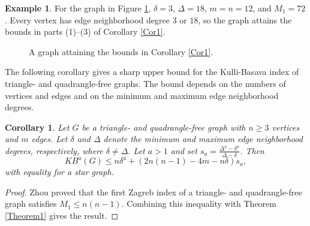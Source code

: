 \documentclass[11pt, oneside]{amsart}   	%
\newtheorem{cor}[theorem]{Corollary}
\theoremstyle{definition}
\newtheorem{example}[theorem]{Example}
\theoremstyle{remark}
\numberwithin{equation}{section}
\begin{document}
\begin{example}
For the graph in Figure \ref{fig:1}, $\delta=3$, $\Delta=18$, $m=n=12$, and $M_1=72$. Every vertex has edge neighborhood degree $3$ or $18$, so the graph attains the bounds in parts (1)--(3) of Corollary \ref{Cor1}.
\begin{figure}[h]
\centering
\begin{minipage}{.4\textwidth}
  \centering
\caption{A graph attaining the bounds in Corollary \ref{Cor1}.}
  \label{fig:1}
\end{minipage}%

\end{figure}
\end{example}

The following corollary gives a sharp upper bound for the Kulli-Basava index of triangle- and quadrangle-free graphs. The bound depends on the numbers of vertices and edges and on the minimum and maximum edge neighborhood degrees.

\begin{cor}
Let $G$ be a triangle- and quadrangle-free graph with $n\geq 3$ vertices and $m$ edges. Let $\delta$ and $\Delta$ denote the minimum and maximum edge neighborhood degrees, respectively, where $\delta\neq\Delta$. Let $a>1$ and set $s_a=\frac{\Delta^a-\delta^a}{\Delta-\delta}$. Then
\[
KB^a(G)\leq n\delta^a+(2n(n-1)-4m-n\delta)s_a,
\]
with equality for a star graph.
\end{cor}

\begin{proof}
Zhou \cite{zhou2006note} proved that the first Zagreb index of a triangle- and quadrangle-free graph satisfies $M_1\leq n(n-1)$. Combining this inequality with Theorem \ref{Theorem1} gives the result.
\end{proof}
\end{document}
